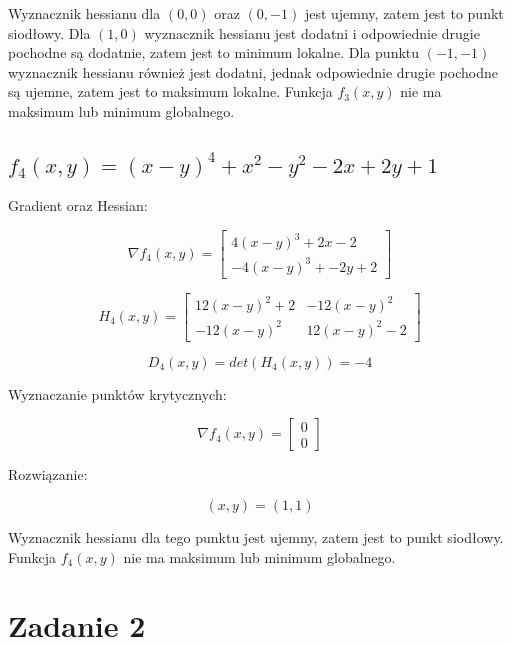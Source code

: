 \documentclass{article}
\begin{document}
	Wyznacznik hessianu dla $(0,0)$ oraz $(0, -1)$ jest ujemny, zatem jest to punkt siodłowy. Dla $(1,0)$ wyznacznik hessianu jest dodatni i odpowiednie drugie pochodne są dodatnie, zatem jest to minimum lokalne. Dla punktu $(-1,-1)$ wyznacznik hessianu również jest dodatni, jednak odpowiednie drugie pochodne są ujemne, zatem jest to maksimum lokalne. Funkcja $f_3(x,y)$ nie ma maksimum lub minimum globalnego.


	\subsection*{$f_4(x,y) = (x-y)^4 + x^2 - y^2 - 2x + 2y + 1$}

	Gradient oraz Hessian:

	\begin{equation}
		\nabla f_4(x,y) = \begin{bmatrix} 4(x-y)^3+2x-2 \\ -4(x-y)^3+-2y+2 \end{bmatrix}
	\end{equation}

	\begin{equation}
		H_4(x,y) = \begin{bmatrix} 12(x-y)^2+2 & -12(x-y)^2\\ -12(x-y)^2 & 12(x-y)^2-2\end{bmatrix}
	\end{equation}

	\begin{equation}
		D_4(x,y) = det(H_4(x,y)) = -4
	\end{equation}

	Wyznaczanie punktów krytycznych:

	\begin{equation}
		\nabla f_4(x,y) = \begin{bmatrix} 0 \\ 0 \end{bmatrix}
	\end{equation}

	Rozwiązanie:
	
	\begin{equation}
		(x,y) = (1,1)
	\end{equation}

	Wyznacznik hessianu dla tego punktu jest ujemny, zatem jest to punkt siodłowy. Funkcja $f_4(x,y)$ nie ma maksimum lub minimum globalnego.

	\newpage

	\section*{Zadanie 2}
\end{document}
